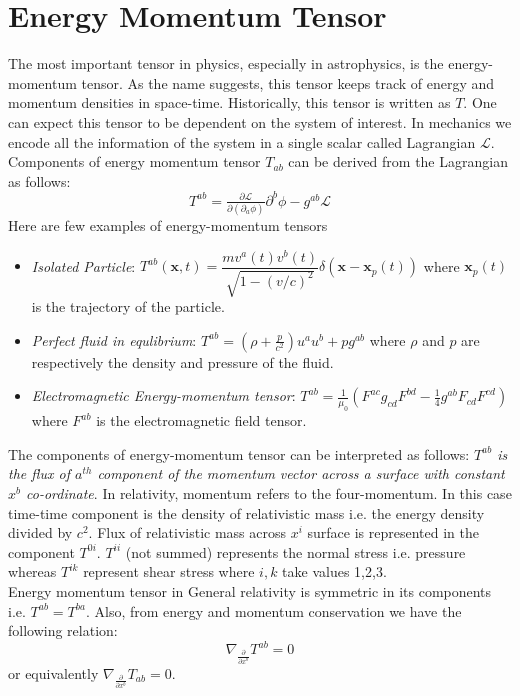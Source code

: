 \documentclass[a4paper]{report}
\theoremstyle{definition}
\theoremstyle{remark}
\begin{document}
	\section{Energy Momentum Tensor}
		The most important tensor in physics, especially in astrophysics, is the energy-momentum tensor. As the name suggests, this tensor keeps track of energy and momentum densities in space-time. Historically, this tensor is written as $T$. One can expect this tensor to be dependent on the system of interest. In mechanics we encode all the information of the system in a single scalar called Lagrangian $\mathcal{L}$. Components of energy momentum tensor $T_{ab}$ can be derived from the Lagrangian as follows:
		\begin{equation*}
			T^{ab} = \tfrac{\partial \mathcal{L}}{\partial (\partial _a \phi)}\partial^b \phi - g^{ab}\mathcal{L}
		\end{equation*}
		Here are few examples of energy-momentum tensors
		\begin{itemize}
			\item \textit{Isolated Particle}: $T^{ab}(\textbf{x},t) = \dfrac{mv^a(t)v^b(t)}{\sqrt{1-(v/c)^2}}\delta(\textbf{x}-\textbf{x}_p(t))$ where $\textbf{x}_p(t)$ is the trajectory of the particle.
			\item \textit{Perfect fluid in equlibrium}: $T^{ab} = \left(\rho + \tfrac{p}{c^2}\right)u^au^b + pg^{ab}$ where $\rho$ and $p$ are respectively the density and pressure of the fluid.
			\item \textit{Electromagnetic Energy-momentum tensor}: $T^{ab} = \frac{1}{\mu_0}\left(F^{ac}g_{cd}F^{bd} - \frac{1}{4}g^{ab}F_{cd}F^{cd}\right)$ where $F^{ab}$ is the electromagnetic field tensor.
		\end{itemize}
		The components of energy-momentum tensor can be interpreted as follows:\emph{ $T^{ab}$ is the flux of $a^{th}$ component of the momentum vector across a surface with constant $x^{b}$ co-ordinate}. In relativity, momentum refers to the four-momentum. In this case time-time component is the density of relativistic mass i.e. the energy density divided by $c^2$. Flux of relativistic mass across $x^i$ surface is represented in the component $T^{0i}$. $T^{ii}$ (not summed) represents the normal stress i.e. pressure whereas $T^{ik}$ represent shear stress where $i,k$ take values 1,2,3.
		\\ Energy momentum tensor in General relativity is symmetric in its components i.e. $T^{ab} = T^{ba}$. Also, from energy and momentum conservation we have the following relation:
		\begin{equation*}
			\nabla_{\tfrac{\partial}{\partial x^b}}T^{ab} = 0
		\end{equation*}
		or equivalently $\nabla_{\tfrac{\partial}{\partial x^b}}T_{ab} = 0$.
\end{document}
